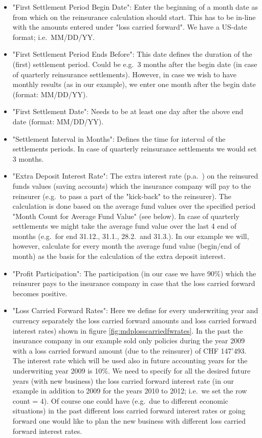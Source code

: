 \begin{itemize}
	\item "First Settlement Period Begin Date": Enter the beginning of a month date as from which on the reinsurance calculation should start. This has to be in-line with the amounts entered under "loss carried forward". We have a US-date format; i.e.~MM/DD/YY.
	\item "First Settlement Period Ends Before": This date defines the duration of the (first) settlement period. Could be e.g.~3 months after the begin date (in case of quarterly reinsurance settlements). However, in case we wish to have monthly results (as in our example), we enter one month after the begin date (format: MM/DD/YY).
	\item "First Settlement Date": Needs to be at least one day after the above end date (format: MM/DD/YY).
	\item "Settlement Interval in Months": Defines the time for interval of the settlements periods. In case of quarterly reinsurance settlements we would set 3 months.
	\item "Extra Deposit Interest Rate": The extra interest rate (p.a.~) on the reinsured funds values (saving accounts) which the insurance company will pay to the reinsurer (e.g.~to pass a part of the "kick-back" to the reinsurer). The calculation is done based on the average fund values over the specified period "Month Count for Average Fund Value" (see below). In case of quarterly settlements we might take the average fund value over the last 4 end of months (e.g.~for end 31.12., 31.1., 28.2.~and 31.3.). In our example we will, however, calculate for every month the average fund value (begin/end of month) as the basis for the calculation of the extra deposit interest.
	\item "Profit Participation": The participation (in our case we have 90\%) which the reinsurer pays to the insurance company in case that the loss carried forward becomes positive.
	\item "Loss Carried Forward Rates": Here we define for every underwriting year and currency separately the loss carried forward amounts and loss carried forward interest rates) shown in figure \ref{fig:mdplosscarriedfwrates}. In the past the insurance company in our example sold only policies during the year 2009 with a loss carried forward amount (due to the reinsurer) of CHF 147'493. The interest rate which will be used also in future accounting years for the underwriting year 2009 is 10\%. We need to specify for all the desired future years (with new business) the loss carried forward interest rate (in our example in addition to 2009 for the years 2010 to 2012; i.e.~we set the row count = 4). Of course one could have (e.g.~due to different economic situations) in the past different loss carried forward interest rates or going forward one would like to plan the new business with different loss carried forward interest rates.
	

\end{itemize}
